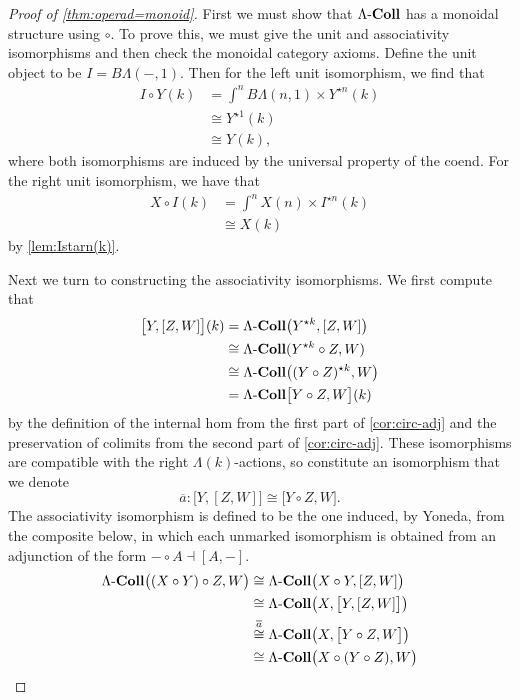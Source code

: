 \begin{proof}[Proof of \cref{thm:operad=monoid}]
First we must show that $\Lambda\mbox{-}\mathbf{Coll}$ has a monoidal structure using $\circ$. To prove this, we must give the unit and associativity isomorphisms and then check the monoidal category axioms. Define the unit object to be $I = B\Lambda(-,1)$. Then for the left unit isomorphism, we find that
  \begin{align*}
    I \circ Y (k) &= \int^{n} B\Lambda(n,1) \times Y^{\star n}(k) \\
    &\cong Y^{\star 1}(k) \\
    &\cong Y(k),
  \end{align*}
where both isomorphisms are induced by the universal property of the coend. For the right unit isomorphism, we have that
  \begin{align*}
    X \circ I (k) &= \int^{n} X(n) \times I^{\star n}(k) \\
    &\cong X(k)
  \end{align*}
by \cref{lem:Istarn(k)}.

Next we turn to constructing the associativity isomorphisms.
We first compute that
\begin{align*}
\big[ Y, [Z,W] \big](k) & = \Lambda\mbox{-}\mathbf{Coll} \big( Y^{\star k}, [Z, W] \big) \\
& \cong \Lambda\mbox{-}\mathbf{Coll} ( Y^{\star k} \circ Z, W) \\
& \cong \Lambda\mbox{-}\mathbf{Coll} \big( (Y \circ Z)^{\star k}, W \big) \\
& = \Lambda\mbox{-}\mathbf{Coll} \big[ Y \circ Z, W \big] (k)
\end{align*}
by the definition of the internal hom from the first part of \cref{cor:circ-adj} and the preservation of colimits from the second part of \cref{cor:circ-adj}.
These isomorphisms are compatible with the right $\Lambda(k)$-actions, so constitute an isomorphism that we denote
\[
\overline{a} \colon \big[ Y, [Z,W] \big] \cong \big[ Y \circ Z, W \big].
\]
The associativity isomorphism is defined to be the one induced, by Yoneda, from the composite below, in which each unmarked isomorphism is obtained from an adjunction of the form $- \circ A \dashv [A, -]$.
\begin{align*}
\Lambda\mbox{-}\mathbf{Coll} \big( (X \circ Y) \circ Z, W \big) & \cong \Lambda\mbox{-}\mathbf{Coll} \big( X \circ Y, [Z, W] \big) \\
& \cong \Lambda\mbox{-}\mathbf{Coll} \big( X, \big[ Y, [Z,W] \big] \big) \\
& \stackrel{\overline{a}}{\cong} \Lambda\mbox{-}\mathbf{Coll} \big( X, \big[ Y \circ Z, W \big] \big) \\
& \cong \Lambda\mbox{-}\mathbf{Coll} \big(X \circ (Y \circ Z), W \big)
\end{align*}


\end{proof}

